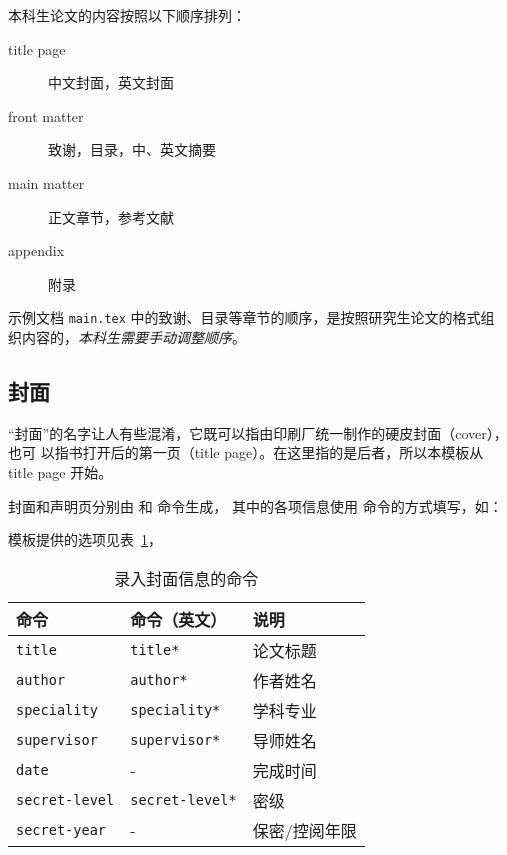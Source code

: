 \documentclass[a4paper]{ltxdoc}
\DeclareRobustCommand\file{\nolinkurl}
\DeclareRobustCommand\opt{\texttt}
\begin{document}
本科生论文的内容按照以下顺序排列：
\begin{description}
  \item[title page] 中文封面，英文封面
  \item[front matter] 致谢，目录，中、英文摘要
  \item[main matter] 正文章节，参考文献
  \item[appendix] 附录
\end{description}

示例文档 \file{main.tex} 中的致谢、目录等章节的顺序，是按照研究生论文的格式组
织内容的，\emph{本科生需要手动调整顺序}。


\subsection{封面}

“封面”的名字让人有些混淆，它既可以指由印刷厂统一制作的硬皮封面（cover），也可
以指书打开后的第一页（title page）。在这里指的是后者，所以本模板从 title page
开始。

\DescribeMacro{\maketitle}
\DescribeMacro{\copyrightpage}
封面和声明页分别由  和  命令生成，
其中的各项信息使用  命令的方式填写，如：
\begin{latex}
\end{latex}
模板提供的选项见表~\ref{tab:covercmds}，
\begin{table}[htb]
  \centering\small
  \caption{录入封面信息的命令}
  \label{tab:covercmds}
  \begin{tabular}{lll}
    \toprule
    命令               & 命令（英文）        & 说明          \\
    \midrule
    \opt{title}        & \opt{title*}        & 论文标题      \\
    \opt{author}       & \opt{author*}       & 作者姓名      \\
    \opt{speciality}   & \opt{speciality*}   & 学科专业      \\
    \opt{supervisor}   & \opt{supervisor*}   & 导师姓名      \\
    \opt{date}         & -                   & 完成时间      \\
    \opt{secret-level} & \opt{secret-level*} & 密级          \\
    \opt{secret-year}  & -                   & 保密/控阅年限 \\
    \bottomrule
  \end{tabular}
\end{table}
\end{document}
